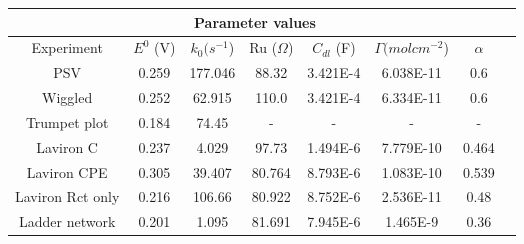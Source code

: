 \documentclass[preview]{standalone}
\begin{document}
\begin{center}
\begin{tabular}{|c|c|c|c|c|c|c|c|}
\hline
\multicolumn{7}{|c|}{Parameter values}\\ 
\hline
Experiment & $E^0$ (V) & $k_0 (s^{-1}$) & Ru ($\Omega$) & $C_{dl}$ (F) & $\Gamma (mol cm^{-2}$) & $\alpha$\\
\hline
PSV & 0.259 & 177.046 & 88.32 & 3.421E-4 & 6.038E-11 & 0.6\\
\hline
Wiggled & 0.252 & 62.915 & 110.0 & 3.421E-4 & 6.334E-11 & 0.6\\
\hline
Trumpet plot & 0.184 & 74.45 & - & - & - & -\\
\hline
Laviron C & 0.237 & 4.029 & 97.73 & 1.494E-6 & 7.779E-10 & 0.464\\
\hline
Laviron CPE & 0.305 & 39.407 & 80.764 & 8.793E-6 & 1.083E-10 & 0.539\\
\hline
Laviron Rct only & 0.216 & 106.66 & 80.922 & 8.752E-6 & 2.536E-11 & 0.48\\
\hline
Ladder network & 0.201 & 1.095 & 81.691 & 7.945E-6 & 1.465E-9 & 0.36\\
\hline
\end{tabular}
\end{center}
\end{document}
